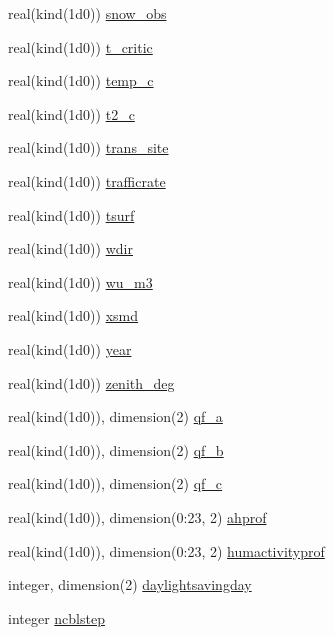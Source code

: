 \begin{DoxyCompactItemize}
real(kind(1d0)) \hyperlink{namespacedata__in_ac93d21776972756112d04651ac3cbb22}{snow\+\_\+obs}
\item 
real(kind(1d0)) \hyperlink{namespacedata__in_aafa124a0fedbdd3fd681dc1de7da58f1}{t\+\_\+critic}
\item 
real(kind(1d0)) \hyperlink{namespacedata__in_aaac1000f5b2d5c88466c307795518d4c}{temp\+\_\+c}
\item 
real(kind(1d0)) \hyperlink{namespacedata__in_a4bb1b5c9961c3b92df299792352bed5b}{t2\+\_\+c}
\item 
real(kind(1d0)) \hyperlink{namespacedata__in_a9c53dc9992f8f407198edbaea657599a}{trans\+\_\+site}
\item 
real(kind(1d0)) \hyperlink{namespacedata__in_aba0ff641b30b686cf5afdd358761c586}{trafficrate}
\item 
real(kind(1d0)) \hyperlink{namespacedata__in_a743440f75d11d6596e13e18b78d7f531}{tsurf}
\item 
real(kind(1d0)) \hyperlink{namespacedata__in_a42491a5943973e024de52949b4cdaa53}{wdir}
\item 
real(kind(1d0)) \hyperlink{namespacedata__in_ae8c7901bd4995fbdec3868c38d2101b1}{wu\+\_\+m3}
\item 
real(kind(1d0)) \hyperlink{namespacedata__in_a22f13004f0c25b6603cceb88897eaee5}{xsmd}
\item 
real(kind(1d0)) \hyperlink{namespacedata__in_a491ee3189141ae36fd29fde5cc020b53}{year}
\item 
real(kind(1d0)) \hyperlink{namespacedata__in_a332530944dd5c37316f92c3c74350e83}{zenith\+\_\+deg}
\item 
real(kind(1d0)), dimension(2) \hyperlink{namespacedata__in_a44d4947885c1f0f8cd0924c7147d084b}{qf\+\_\+a}
\item 
real(kind(1d0)), dimension(2) \hyperlink{namespacedata__in_ac8582577b56253d36f68dcc213c7bfa4}{qf\+\_\+b}
\item 
real(kind(1d0)), dimension(2) \hyperlink{namespacedata__in_aac91e60fdee7233d397c1fdbfcd65505}{qf\+\_\+c}
\item 
real(kind(1d0)), dimension(0\+:23, 2) \hyperlink{namespacedata__in_adacab1a738e29a24443b23231bf40111}{ahprof}
\item 
real(kind(1d0)), dimension(0\+:23, 2) \hyperlink{namespacedata__in_a3cb096487decd1f0cec9c289cba1eae6}{humactivityprof}
\item 
integer, dimension(2) \hyperlink{namespacedata__in_a0aac3556805fc05672641d8bb59558e2}{daylightsavingday}
\item 
integer \hyperlink{namespacedata__in_ad8e5dc33bb1aacb37406f71ac93929ba}{ncblstep}

\end{DoxyCompactItemize}
